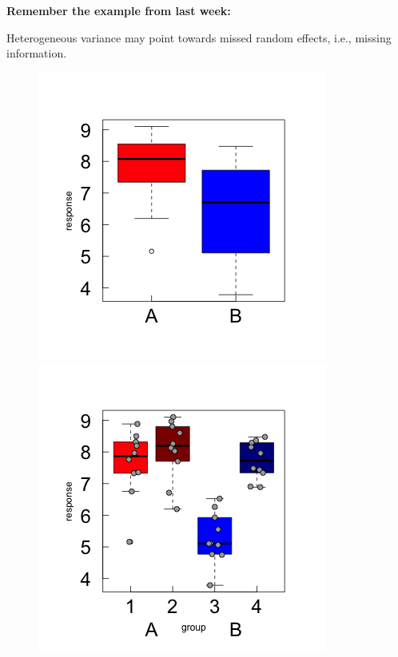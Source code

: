 \documentclass{beamer}
\begin{document}
\begin{frame}
    \frametitle{}
    \textbf{Remember the example from last week:}
    
    Heterogeneous variance may point towards missed random effects, i.e., missing information.

    \begin{figure}
        \centering
        \includegraphics[width=0.4\linewidth]{lectures/day_2_LM_refresh_I/figures/unnamed-chunk-43-1.png}
        \includegraphics[width=0.4\linewidth]{lectures/day_2_LM_refresh_I/figures/unnamed-chunk-44-1.png}
    \end{figure}
\end{frame}
\end{document}
